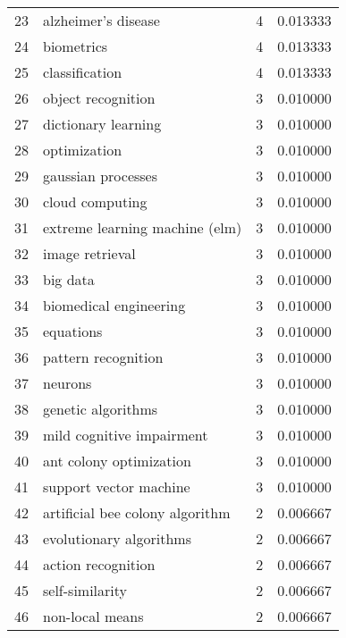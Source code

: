 \begin{tabular}{llrr}
23 &                alzheimer's disease &           4 &    0.013333 \\
24 &                         biometrics &           4 &    0.013333 \\
25 &                     classification &           4 &    0.013333 \\
26 &                 object recognition &           3 &    0.010000 \\
27 &                dictionary learning &           3 &    0.010000 \\
28 &                       optimization &           3 &    0.010000 \\
29 &                 gaussian processes &           3 &    0.010000 \\
30 &                    cloud computing &           3 &    0.010000 \\
31 &     extreme learning machine (elm) &           3 &    0.010000 \\
32 &                    image retrieval &           3 &    0.010000 \\
33 &                           big data &           3 &    0.010000 \\
34 &             biomedical engineering &           3 &    0.010000 \\
35 &                          equations &           3 &    0.010000 \\
36 &                pattern recognition &           3 &    0.010000 \\
37 &                            neurons &           3 &    0.010000 \\
38 &                 genetic algorithms &           3 &    0.010000 \\
39 &          mild cognitive impairment &           3 &    0.010000 \\
40 &            ant colony optimization &           3 &    0.010000 \\
41 &             support vector machine &           3 &    0.010000 \\
42 &    artificial bee colony algorithm &           2 &    0.006667 \\
43 &            evolutionary algorithms &           2 &    0.006667 \\
44 &                 action recognition &           2 &    0.006667 \\
45 &                    self-similarity &           2 &    0.006667 \\
46 &                    non-local means &           2 &    0.006667 \\

\end{tabular}

